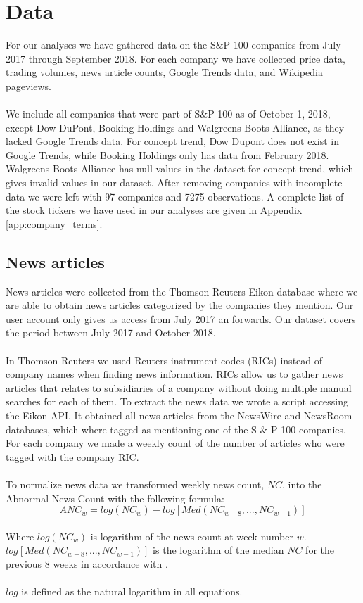 
\chapter{Data}
For our analyses we have gathered data on the  S\&P 100 companies from July 2017 through September 2018. For each company we have collected price data, trading volumes, news article counts, Google Trends data, and Wikipedia pageviews.  
\\\\
We include all companies that were part of S\&P 100 as of October 1, 2018, except Dow DuPont, Booking Holdings and Walgreens Boots Alliance, as they lacked Google Trends data. For concept trend, Dow Dupont does not exist in Google Trends, while Booking Holdings only has data from February 2018. Walgreens Boots Alliance has null values in the dataset for concept trend, which gives invalid values in our dataset. After removing companies with incomplete data we were left with 97 companies and 7275 observations. A complete list of the stock tickers we have used in our analyses are given in Appendix \ref{app:company_terms}.


\section{News articles}
News articles were collected from the Thomson Reuters Eikon database where we are able to obtain news articles categorized by the companies they mention. Our user account only gives us access from July 2017 an forwards. Our dataset covers the period between July 2017 and October 2018.
\\\\
 In Thomson Reuters we used Reuters instrument codes (RICs) instead of company names when finding news information. RICs allow us to  gather news articles that relates to subsidiaries of a company without doing multiple manual searches for each of them. To extract the news data we wrote a script accessing the Eikon API. It obtained all news articles from the NewsWire and NewsRoom databases, which where tagged as mentioning  one of the S \& P 100 companies. For each company we made a weekly count of the number of articles who were tagged with the company RIC.
\\\\
To normalize news data we transformed weekly news count, $NC$, into the Abnormal News Count with the following formula:
\begin{equation}
   \label{abnormal_news} 
   ANC_{w} = log(NC_{w}) - log[Med(NC_{w-8},...,NC_{w-1})] 
\end{equation}
\\
Where $log(NC_{w})$ is logarithm of the news count at week number $w$. $log[Med(NC_{w-8},...,NC_{w-1})]$ is the logarithm of the median $NC$ for the previous 8 weeks in accordance with \cite{engelberg}. 
\\\\
$log$ is defined as the natural logarithm in all equations. 
\\\\
